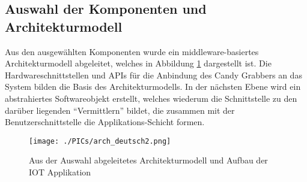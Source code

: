 \documentclass[BMR,Bachelor,ngerman]{twbook}%
\begin{document}
\subsection{Auswahl der Komponenten und Architekturmodell}
Aus den ausgewählten Komponenten wurde ein middleware-basiertes Architekturmodell abgeleitet, welches in Abbildung \ref{fig:arch} dargestellt ist. Die Hardwareschnittstellen und \acp{API} für die Anbindung des Candy Grabbers an das System bilden die Basis des Architekturmodells. In der nächsten Ebene wird ein abstrahiertes Softwareobjekt erstellt, welches wiederum die Schnittstelle zu den darüber liegenden ``Vermittlern'' bildet, die zusammen mit der Benutzerschnittstelle die Applikations-Schicht formen.
%
\begin{figure}[!htbp]
\centering
\texttt{[image: ./PICs/arch\_deutsch2.png]}
\caption{Aus der Auswahl abgeleitetes Architekturmodell und Aufbau der \ac{IOT} Applikation}\label{fig:arch}
\end{figure}
%
\clearpage
\end{document}
